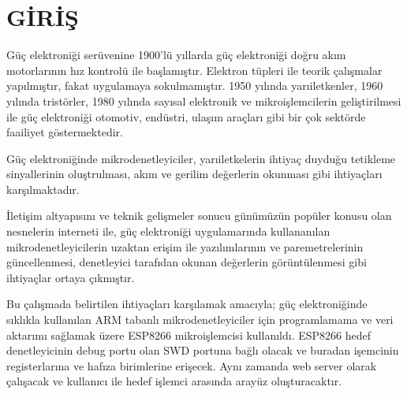 \chapter{GİRİŞ}

Güç elektroniği serüvenine 1900'lü yıllarda güç elektroniği doğru akım motorlarının hız kontrolü ile başlamıştır.
Elektron tüpleri ile teorik çalışmalar yapılmıştır, fakat uygulamaya sokulmamıştır.
1950 yılında yarıiletkenler, 1960 yılında tristörler, 1980 yılında sayısal elektronik ve
mikroişlemcilerin geliştirilmesi ile güç elektroniği otomotiv, endüstri, ulaşım araçları gibi bir çok sektörde faailiyet
göstermektedir.

Güç elektroniğinde mikrodenetleyiciler, yarıiletkelerin ihtiyaç duyduğu tetikleme sinyallerinin oluştrulması,
akım ve gerilim değerlerin okunması gibi ihtiyaçları karşılmaktadır.

İletişim altyapısını ve teknik gelişmeler sonucu günümüzün popüler konusu olan nesnelerin interneti ile,
güç elektroniği uygulamarında kullananılan mikrodenetleyicilerin uzaktan erişim ile yazılımlarının ve paremetrelerinin
güncellenmesi, denetleyici tarafıdan okunan değerlerin görüntülenmesi gibi ihtiyaçlar ortaya çıkmıştır.

Bu çalışmada belirtilen ihtiyaçları karşılamak amacıyla; güç elektroniğinde sıklıkla kullanılan ARM tabanlı mikrodenetleyiciler
için programlamama ve veri aktarımı sağlamak üzere ESP8266 mikroişlemcisi kullanıldı.
ESP8266 hedef denetleyicinin debug portu olan \acrfull{SWD} portuna bağlı olacak ve buradan işemcinin
registerlarına ve hafıza birimlerine erişecek. Aynı zamanda web server olarak çalışacak ve kullanıcı ile hedef
işlemci arasında arayüz oluşturacaktır.



